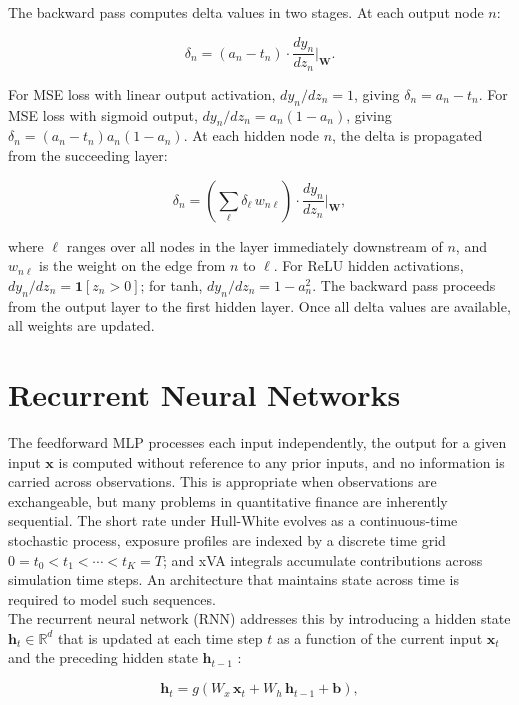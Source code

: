     \noindent 
    The backward pass computes delta values in two stages. At each output node $n$:

    \[
    \delta_n = (a_n - t_n) \cdot \frac{dy_n}{dz_n}\bigg|_\mathbf{W}.
    \]

    \noindent 
    For MSE loss with linear output activation, $dy_n/dz_n = 1$, giving $\delta_n = a_n - t_n$. For MSE loss with sigmoid output, $dy_n/dz_n = a_n(1 - a_n)$, giving $\delta_n = (a_n - t_n) a_n (1 - a_n)$. At each hidden node $n$, the delta is propagated from the succeeding layer:

    \[
    \delta_n = \left(\sum_{\ell} \delta_\ell \, w_{n\ell}\right) \cdot
    \frac{dy_n}{dz_n}\bigg|_\mathbf{W},
    \]

    \noindent 
    where $\ell$ ranges over all nodes in the layer immediately downstream of $n$, and $w_{n\ell}$ is the weight on the edge from $n$ to $\ell$. For ReLU hidden activations, $dy_n/dz_n = \mathbf{1}[z_n > 0]$; for tanh, $dy_n/dz_n = 1 - a_n^2$. The backward pass proceeds from the output layer to the first hidden layer. Once all delta values are available, all weights are updated. 

    \section*{Recurrent Neural Networks}

    The feedforward MLP processes each input independently, the output for a given input $\mathbf{x}$ is computed without reference to any prior inputs, and no information is carried across observations. This is appropriate when observations are exchangeable, but many problems in quantitative finance are inherently sequential. The short rate under Hull-White evolves as a continuous-time stochastic process, exposure profiles are indexed by a discrete time grid
    $0 = t_0 < t_1 < \cdots < t_K = T$; and xVA integrals accumulate contributions across simulation time steps. An architecture that maintains state across time is required to model such sequences. \\

    \noindent 
    The recurrent neural network (RNN) addresses this by introducing a hidden state $\mathbf{h}_t \in \mathbb{R}^d$ that is updated at each time step $t$ as a function of the current input $\mathbf{x}_t$ and the preceding hidden state $\mathbf{h}_{t-1}$ \citep{goodfellow2016deep}:

    \[
    \mathbf{h}_t = g\!\left(W_x\, \mathbf{x}_t + W_h\, \mathbf{h}_{t-1} + \mathbf{b}\right),
    \]

